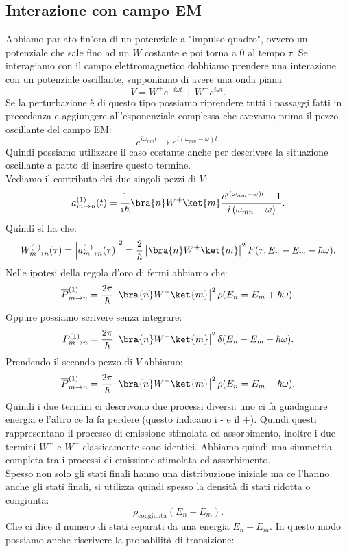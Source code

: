 \subsection{Interazione con campo EM}%
\label{sub:Interazione con campo EM}
Abbiamo parlato fin'ora di un potenziale a "impulso quadro", ovvero un potenziale che sale fino ad un $W$  costante e poi torna a 0 al tempo $\tau$. Se interagiamo con il campo elettromagnetico dobbiamo prendere una interazione con un potenziale oscillante, supponiamo di avere una onda piana
\[
V=W^+ e^{-i\omega t} + W^- e^{i\omega t} 
.\] 
Se la perturbazione è di questo tipo possiamo riprendere tutti i passaggi fatti in precedenza e aggiungere all'esponenziale complessa che avevamo prima il pezzo oscillante del campo EM:
\[
    e^{i\omega_{mn}t} \to e^{i(\omega_{mn}-\omega)t }
.\] 
Quindi possiamo utilizzare il caso costante anche per descrivere la situazione oscillante a patto di inserire questo termine.\\
Vediamo il contributo dei due singoli pezzi di $V$:
\[
    a_{m\to n}^{(1)}(t) =
    \frac{1}{i\hbar }\bra{n}W^+ \ket{m} \frac{e^{i(\omega_{nm}-\omega )t}-1}{i\left( \omega_{mn}-\omega\right)}
.\] 
Quindi si ha che:
\[
    W^{(1) }_{m\to n}(\tau) =
    \left|a^{(1)}_{m\to n}(\tau) \right|^2 =
    \frac{2}{\hbar }\left|\bra{n}W^+ \ket{m}\right|^2 F(\tau,E_n-E_m - \hbar \omega) 
.\] 
Nelle ipotesi della regola d'oro di fermi abbiamo che:
\[
    \overline{P}^{(1)}_{m\to n} = \frac{2\pi}{\hbar }\left|\bra{n}W^+ \ket{m}\right|^2\rho(E_n=E_m+\hbar \omega) 
.\] 
Oppure possiamo scrivere senza integrare:
\[
    P^{(1)}_{m\to n} = \frac{2\pi}{\hbar }\left|\bra{n}W^+ \ket{m}\right|^2\delta (E_n-E_m-\hbar \omega) 
.\] 
Prendendo il secondo pezzo di $V$ abbiamo:
\[
    \overline{P}^{(1)}_{m\to n} = \frac{2\pi}{\hbar }\left|\bra{n}W^- \ket{m}\right|^2\rho(E_n=E_m-\hbar \omega) 
.\] 
Quindi i due termini ci descrivono due processi diversi: uno ci fa guadagnare energia e l'altro ce la fa perdere (questo indicano i - e il +). Quindi questi rappresentano il processo di emissione stimolata ed assorbimento, inoltre i due termini $W^+$ e $W^-$ classicamente sono identici. Abbiamo quindi una simmetria completa tra i processi di emissione stimolata ed assorbimento.\\
Spesso non solo gli stati finali hanno una distribuzione iniziale ma ce l'hanno anche gli stati finali, si utilizza quindi spesso la densità di stati ridotta o congiunta:
\[
    \rho_\text{congiunta} (E_n-E_m) 
.\] 
Che ci dice il numero di stati separati da una energia $E_n-E_m$. In questo modo possiamo anche riscrivere la probabilità di transizione:
